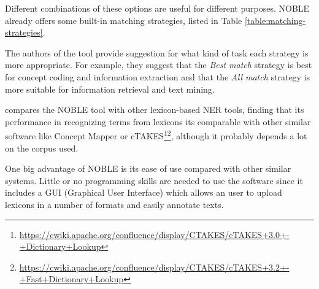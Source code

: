 Different combinations of these options are useful for different purposes. NOBLE already offers some built-in matching strategies, listed in Table \ref{table:matching-strategies}.

\begin{table}[ht]
\centering
\caption{NOBLE matching strategies present in the GUI interface. Adapted from \citep{Tseytlin2016}. This correspond to the options used in the GUI tool.}
\label{table:matching-strategies}
\end{table}

The authors of the tool provide suggestion for what kind of task each strategy is more appropriate. For example, they suggest that the \textit{Best match} strategy is best for concept coding and information extraction and that the \textit{All match} strategy is more suitable for information retrieval and text mining.

\citep{Tseytlin2016} compares the NOBLE tool with other lexicon-based NER tools, finding that its performance in recognizing terms from lexicons its comparable with other similar software like Concept Mapper \citep{Stewart} or cTAKES\footnote{\url{https://cwiki.apache.org/confluence/display/CTAKES/cTAKES+3.0+-+Dictionary+Lookup}}\footnote{\url{https://cwiki.apache.org/confluence/display/CTAKES/cTAKES+3.2+-+Fast+Dictionary+Lookup}}, although it probably depends a lot on the corpus used.

One big advantage of NOBLE is its ease of use compared with other similar systems. Little or no programming skills are needed to use the software since it includes a GUI (Graphical User Interface) which allows an user to upload lexicons in a number of formats and easily annotate texts.

